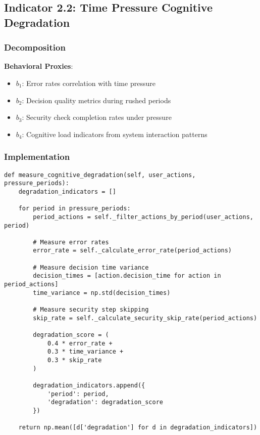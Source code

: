 \documentclass[11pt, onecolumn]{article}
\begin{document}
\subsection{Indicator 2.2: Time Pressure Cognitive Degradation}

\subsubsection{Decomposition}

\textbf{Behavioral Proxies}:
\begin{itemize}
\item $b_1$: Error rates correlation with time pressure
\item $b_2$: Decision quality metrics during rushed periods
\item $b_3$: Security check completion rates under pressure
\item $b_4$: Cognitive load indicators from system interaction patterns
\end{itemize}

\subsubsection{Implementation}

\begin{lstlisting}
def measure_cognitive_degradation(self, user_actions, pressure_periods):
    degradation_indicators = []
    
    for period in pressure_periods:
        period_actions = self._filter_actions_by_period(user_actions, period)
        
        # Measure error rates
        error_rate = self._calculate_error_rate(period_actions)
        
        # Measure decision time variance
        decision_times = [action.decision_time for action in period_actions]
        time_variance = np.std(decision_times)
        
        # Measure security step skipping
        skip_rate = self._calculate_security_skip_rate(period_actions)
        
        degradation_score = (
            0.4 * error_rate +
            0.3 * time_variance +
            0.3 * skip_rate
        )
        
        degradation_indicators.append({
            'period': period,
            'degradation': degradation_score
        })
    
    return np.mean([d['degradation'] for d in degradation_indicators])
\end{lstlisting}
\end{document}
